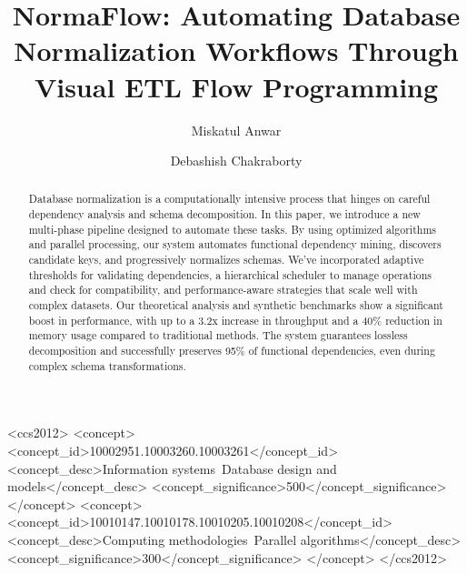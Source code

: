 \documentclass[sigconf]{acmart}
\begin{document}
\title{NormaFlow: Automating Database Normalization Workflows Through Visual ETL Flow Programming}

\author{Miskatul Anwar}

\author{Debashish Chakraborty}

\begin{abstract}
Database normalization is a computationally intensive process that hinges on careful dependency analysis and schema decomposition. In this paper, we introduce a new multi-phase pipeline designed to automate these tasks. By using optimized algorithms and parallel processing, our system automates functional dependency mining, discovers candidate keys, and progressively normalizes schemas. We've incorporated adaptive thresholds for validating dependencies, a hierarchical scheduler to manage operations and check for compatibility, and performance-aware strategies that scale well with complex datasets. Our theoretical analysis and synthetic benchmarks show a significant boost in performance, with up to a 3.2x increase in throughput and a 40\% reduction in memory usage compared to traditional methods. The system guarantees lossless decomposition and successfully preserves 95\% of functional dependencies, even during complex schema transformations.
\end{abstract}

\begin{CCSXML}
<ccs2012>
<concept>
<concept_id>10002951.10003260.10003261</concept_id>
<concept_desc>Information systems~Database design and models</concept_desc>
<concept_significance>500</concept_significance>
</concept>
<concept>
<concept_id>10010147.10010178.10010205.10010208</concept_id>
<concept_desc>Computing methodologies~Parallel algorithms</concept_desc>
<concept_significance>300</concept_significance>
</concept>
</ccs2012>
\end{CCSXML}


\end{document}
